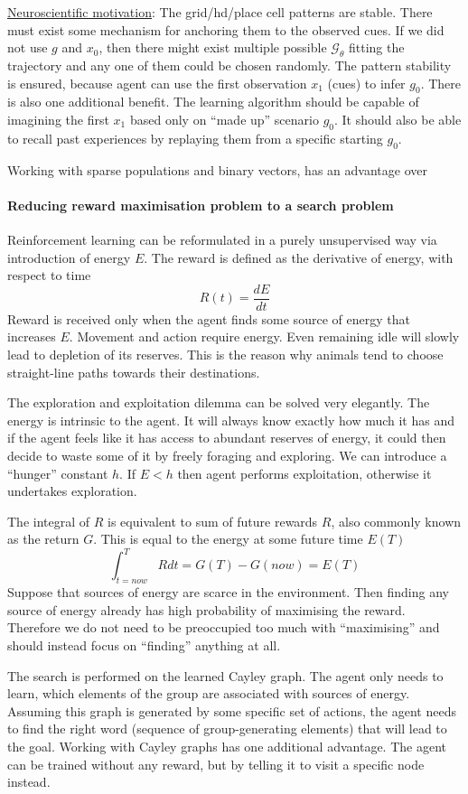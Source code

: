 \documentclass[12pt]{article}
\begin{document}
\underline{Neuroscientific motivation}: The grid/hd/place cell patterns are stable. There must exist some mechanism for anchoring them to the observed cues. If we did not use $g$ and $x_0$, then there might exist multiple possible $\mathcal{G}_\theta$ fitting the trajectory and any one of them could be chosen randomly. The pattern stability is ensured, because agent can use the first observation $x_1$ (cues) to infer $g_0$.
There is also one additional benefit. The learning algorithm should be capable of imagining the first $x_1$ based only on ``made up'' scenario $g_0$. It should also be able to recall past experiences by replaying them from a specific starting $g_0$.

Working with sparse populations and binary vectors, has an advantage over 

\paragraph{Reducing reward maximisation problem to a search problem}
Reinforcement learning can be reformulated in a purely unsupervised way via introduction of energy $E$. The reward is defined as the derivative of energy, with respect to time
\[
R(t) = \frac{dE}{dt}
\]
Reward is received only when the agent finds some source of energy that increases $E$.
Movement and action require energy. Even remaining idle will slowly lead to depletion of its reserves. This is the reason why animals tend to choose straight-line paths towards their destinations. 

The exploration and exploitation dilemma can be solved very elegantly. The energy is intrinsic to the agent. It will always know exactly how much it has and if the agent feels like it has access to abundant reserves of energy, it could then decide to waste some of it by freely foraging and exploring. We can introduce a ``hunger'' constant  $h$. If $E<h$ then agent performs exploitation, otherwise it undertakes exploration.

The integral of $R$ is equivalent to sum of future rewards $R$, also commonly known as the return $G$. This is equal to the energy at some future time $E(T)$
\[
\int_{t=now}^{T} R dt = G(T) - G(now) = E(T)
\]
Suppose that sources of energy are scarce in the environment. Then finding any source of energy already has high probability of maximising the reward. Therefore we do not need to be preoccupied too much with ``maximising'' and should instead focus on ``finding'' anything at all. 

The search is performed on the learned Cayley graph. The agent only needs to learn, which elements of the group are associated with sources of energy. Assuming this graph is generated by some specific set of actions, the agent needs to find the right word (sequence of group-generating elements) that will lead to the goal. Working with Cayley graphs has one additional advantage. The agent can be trained without any reward, but by telling it to visit a specific node instead. 
\end{document}
